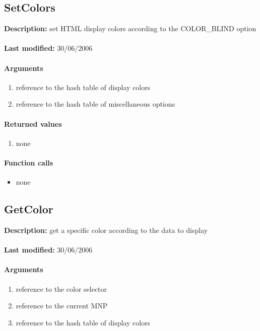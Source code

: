\subsection{SetColors}
\textbf{Description:} set HTML display colors according to the COLOR\_BLIND option\\
\\\textbf{Last modified:} 30/06/2006

\paragraph{Arguments}
\begin{enumerate}
\item reference to the hash table of display colors
\item reference to the hash table of miscellaneous options
\end{enumerate}

\paragraph{Returned values}
\begin{enumerate}
\item none
\end{enumerate}

\paragraph{Function calls}
\begin{itemize}
\item none
\end{itemize}

\subsection{GetColor}
\textbf{Description:} get a specific color according to the data to display\\
\\\textbf{Last modified:} 30/06/2006

\paragraph{Arguments}
\begin{enumerate}
\item reference to the color selector
\item reference to the current MNP
\item reference to the hash table of display colors
\end{enumerate}

